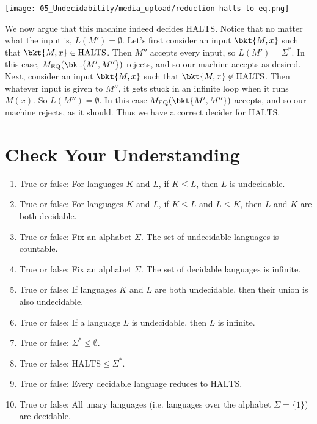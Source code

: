 \begin{flex}
\begin{solution}
\begin{center}
\texttt{[image: 05\_Undecidability/media\_upload/reduction-halts-to-eq.png]}
\end{center}

We now argue that this machine indeed decides $\text{HALTS}$. Notice that no matter what the input is, $L(M') = \emptyset$. Let's first consider an input $\bkt{M,x}$ such that $\bkt{M,x} \in \text{HALTS}$. Then $M''$ accepts every input, so $L(M') = \Sigma^*$. In this case, $M_\text{EQ}(\bkt{M',M''})$ rejects, and so our machine accepts as desired. Next, consider an input $\bkt{M,x}$ such that $\bkt{M,x} \not \in \text{HALTS}$. Then whatever input is given to $M''$, it gets stuck in an infinite loop when it runs $M(x)$. So $L(M'')= \emptyset$. In this case $M_\text{EQ}(\bkt{M',M''})$ accepts, and so our machine rejects, as it should. Thus we have a correct decider for $\text{HALTS}$.
\end{solution}
\end{flex}





\section{Check Your Understanding}

\begin{enumerate}
    \item True or false: For languages $K$ and $L$, if $K \leq L$, then $L$ is undecidable.
    \item True or false: For languages $K$ and $L$, if $K \leq L$ and $L \leq K$, then $L$ and $K$ are both decidable.
    \item True or false: Fix an alphabet $\Sigma$. The set of undecidable languages is countable.
    \item True or false: Fix an alphabet $\Sigma$. The set of decidable languages is infinite.
    \item True or false: If languages $K$ and $L$ are both undecidable, then their union is also undecidable.
    \item True or false: If a language $L$ is undecidable, then $L$ is infinite.
    \item True or false: $\Sigma^* \leq \emptyset$.
    \item True or false: $\text{HALTS} \leq \Sigma^*$.
    \item True or false: Every decidable language reduces to $\text{HALTS}$. 
    \item True or false: All unary languages (i.e. languages over the alphabet $\Sigma = \{1\}$) are decidable.
\end{enumerate}



